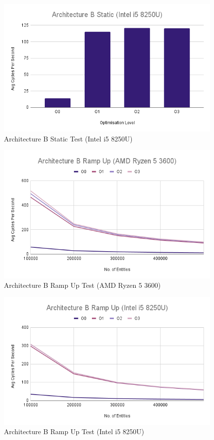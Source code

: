 \documentclass{article}
\begin{document}
\begin{figure}[!h]
\centering
\includegraphics[scale=0.5]{Architecture B Static (Intel i5 8250U).png}
\caption{Architecture B Static Test (Intel i5 8250U)}
\label{arch_b_static_laptop}
\end{figure}

\begin{figure}[!h]
\centering
\includegraphics[scale=0.5]{Architecture B Ramp Up (AMD Ryzen 5 3600).png}
\caption{Architecture B Ramp Up Test (AMD Ryzen 5 3600)}
\label{arch_b_ramp_up_pc}
\end{figure}

\begin{figure}[!h]
\centering
\includegraphics[scale=0.5]{Architecture B Ramp Up (Intel i5 8250U).png}
\caption{Architecture B Ramp Up Test (Intel i5 8250U)}
\label{arch_b_ramp_up_laptop}
\end{figure}
\end{document}
